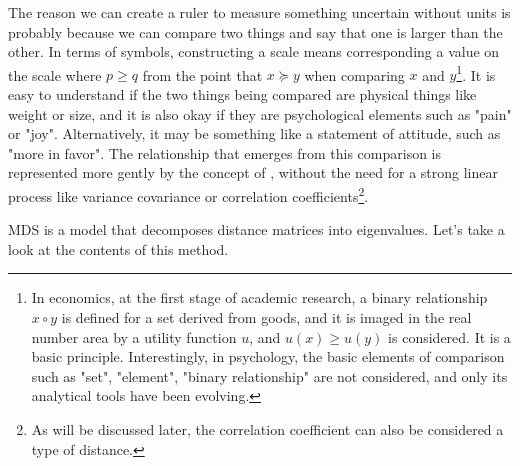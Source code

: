 \documentclass{ltjsbook}
\begin{document}
The reason we can create a ruler to measure something uncertain without units is probably because we can compare two things and say that one is larger than the other.
In terms of symbols, constructing a scale means corresponding a value on the scale where $p \ge q$ from the point that $x \succeq y$ when comparing $x$ and $y$\footnote{In economics, at the first stage of academic research, a binary relationship $x \circ y$ is defined for a set derived from goods, and it is imaged in the real number area by a utility function $u$, and $u(x) \ge u(y)$ is considered. It is a basic principle. Interestingly, in psychology, the basic elements of comparison such as "set", "element", "binary relationship" are not considered, and only its analytical tools have been evolving.}.
It is easy to understand if the two things being compared are physical things like weight or size, and it is also okay if they are psychological elements such as "pain" or "joy". Alternatively, it may be something like a statement of attitude, such as "more in favor".
The relationship that emerges from this comparison is represented more gently by the concept of , without the need for a strong linear process like variance covariance or correlation coefficients\footnote{As will be discussed later, the correlation coefficient can also be considered a type of distance.}.

MDS is a model that decomposes distance matrices into eigenvalues. Let's take a look at the contents of this method.
\end{document}
